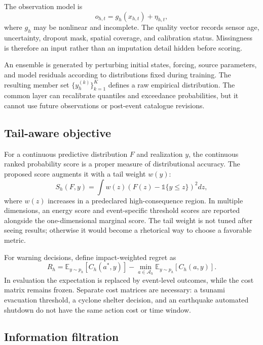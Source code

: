 \documentclass[conference]{IEEEtran}
\begin{document}
The observation model is
\begin{equation}
 o_{h,t}=g_h(x_{h,t})+\eta_{h,t},
 \label{eq:observation}
\end{equation}
where $g_h$ may be nonlinear and incomplete. The quality vector records sensor age, uncertainty, dropout mask, spatial coverage, and calibration status. Missingness is therefore an input rather than an imputation detail hidden before scoring.

An ensemble is generated by perturbing initial states, forcing, source parameters, and model residuals according to distributions fixed during training. The resulting member set $\{y_h^{(k)}\}_{k=1}^K$ defines a raw empirical distribution. The common layer can recalibrate quantiles and exceedance probabilities, but it cannot use future observations or post-event catalogue revisions.

\subsection{Tail-aware objective}

For a continuous predictive distribution $F$ and realization $y$, the continuous ranked probability score is a proper measure of distributional accuracy. The proposed score augments it with a tail weight $w(y)$:
\begin{equation}
 S_h(F,y)=\int w(z)\left(F(z)-\mathbb{1}\{y\leq z\}\right)^2 dz,
 \label{eq:tailscore}
\end{equation}
where $w(z)$ increases in a predeclared high-consequence region. In multiple dimensions, an energy score and event-specific threshold scores are reported alongside the one-dimensional marginal score. The tail weight is not tuned after seeing results; otherwise it would become a rhetorical way to choose a favorable metric.

For warning decisions, define impact-weighted regret as
\begin{equation}
 R_h=\mathbb{E}_{y\sim p_h}[C_h(a^*,y)]-\min_{a\in\mathcal{A}_h}\mathbb{E}_{y\sim p_h}[C_h(a,y)].
 \label{eq:regret}
\end{equation}
In evaluation the expectation is replaced by event-level outcomes, while the cost matrix remains frozen. Separate cost matrices are necessary: a tsunami evacuation threshold, a cyclone shelter decision, and an earthquake automated shutdown do not have the same action cost or time window.

\subsection{Information filtration}
\end{document}
